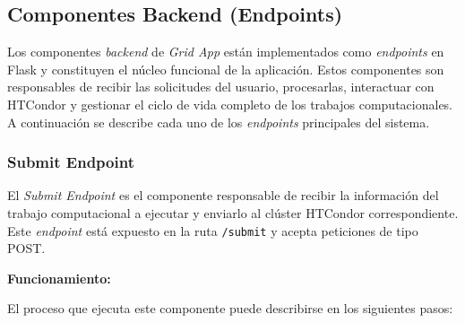\subsection{Componentes Backend (Endpoints)}
\noindent

Los componentes \textit{backend} de \textit{Grid App} están implementados como \textit{endpoints} en Flask y constituyen el núcleo funcional de la aplicación. Estos componentes son responsables de recibir las solicitudes del usuario, procesarlas, interactuar con HTCondor y gestionar el ciclo de vida completo de los trabajos computacionales. A continuación se describe cada uno de los \textit{endpoints} principales del sistema.

\subsubsection{Submit Endpoint}
\noindent

El \textit{Submit Endpoint} es el componente responsable de recibir la información del trabajo computacional a ejecutar y enviarlo al clúster HTCondor correspondiente. Este \textit{endpoint} está expuesto en la ruta \texttt{/submit} y acepta peticiones de tipo POST.

\textbf{Funcionamiento:}

El proceso que ejecuta este componente puede describirse en los siguientes pasos:

